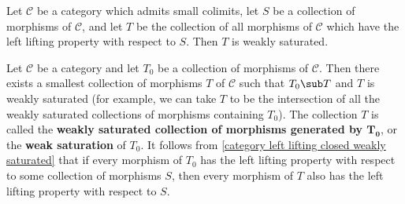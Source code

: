 \begin{proposition}\label{category left lifting closed weakly saturated}
Let $\mathcal{C}$ be a category which admits small colimits, let $S$ be a collection of morphisms of $\mathcal{C}$, and let $T$ be the collection of all morphisms of $\mathcal{C}$ which have the left lifting property with respect to $S$. Then $T$ is weakly saturated.
\end{proposition}
Let $\mathcal{C}$ be a category and let $T_0$ be a collection of morphisms of $\mathcal{C}$. Then there exists a smallest collection of morphisms $T$ of $\mathcal{C}$ such that $T_0\sub T$ and $T$ is weakly saturated (for example, we can take $T$ to be the intersection of all the weakly saturated collections of morphisms containing $T_0$). The collection $T$ is called the \textbf{weakly saturated collection of morphisms generated by $\bm{T_0}$}, or the \textbf{weak saturation} of $T_0$. It follows from \cref{category left lifting closed weakly saturated} that if every morphism of $T_0$ has the left lifting property with respect to some collection of morphisms $S$, then every morphism of $T$ also has the left lifting property with respect to $S$.
